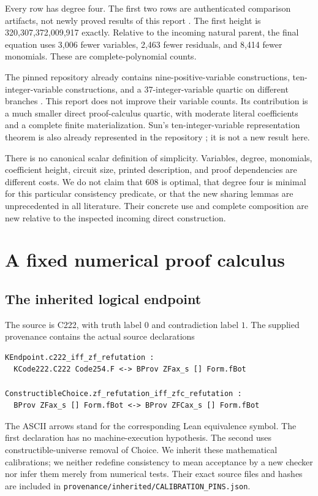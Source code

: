 \documentclass[11pt,letterpaper]{article}
\theoremstyle{definition}\newtheorem{definition}[theorem]{Definition}
\theoremstyle{remark}\newtheorem{remark}[theorem]{Remark}
\begin{document}
Every row has degree four. The first two rows are authenticated comparison
artifacts, not newly proved results of this report
\cite{repo,sharedparent,directreview}. The first height is
320,307,372,009,917 exactly. Relative to the incoming natural parent,
the final equation uses 3,006 fewer variables, 2,463 fewer residuals,
and 8,414 fewer monomials. These are complete-polynomial counts.

The pinned repository already contains nine-positive-variable constructions,
ten-integer-variable constructions, and a 37-integer-variable quartic on
different branches \cite{repo}. This report does not improve their variable
counts. Its contribution is a much smaller direct proof-calculus quartic,
with moderate literal coefficients and a complete finite materialization.
Sun's ten-integer-variable representation theorem is also already represented
in the repository \cite{sun}; it is not a new result here.

There is no canonical scalar definition of simplicity. Variables, degree,
monomials, coefficient height, circuit size, printed description, and proof
dependencies are different costs. We do not claim that 608 is optimal,
that degree four is minimal for this particular consistency predicate, or
that the new sharing lemmas are unprecedented in all literature.
Their concrete use and complete composition are new relative to the
inspected incoming direct construction.

\section{A fixed numerical proof calculus}

\subsection{The inherited logical endpoint}

The source is C222, with truth label $0$ and contradiction label $1$.
The supplied provenance contains the actual source declarations
\begin{lstlisting}
KEndpoint.c222_iff_zf_refutation :
  KCode222.C222 Code254.F <-> BProv ZFax_s [] Form.fBot

ConstructibleChoice.zf_refutation_iff_zfc_refutation :
  BProv ZFax_s [] Form.fBot <-> BProv ZFCax_s [] Form.fBot
\end{lstlisting}
The ASCII arrows stand for the corresponding Lean equivalence symbol.
The first declaration has no machine-execution hypothesis. The second uses
constructible-universe removal of Choice. We inherit these mathematical
calibrations; we neither redefine consistency to mean acceptance by a new
checker nor infer them merely from numerical tests. Their exact source
files and hashes are included in
\texttt{provenance/inherited/CALIBRATION\_PINS.json}.
\end{document}
